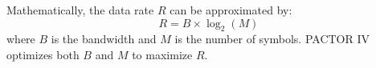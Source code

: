 Mathematically, the data rate \( R \) can be approximated by:
\[ R = B \times \log_2(M) \]
where \( B \) is the bandwidth and \( M \) is the number of symbols. PACTOR IV optimizes both \( B \) and \( M \) to maximize \( R \).


